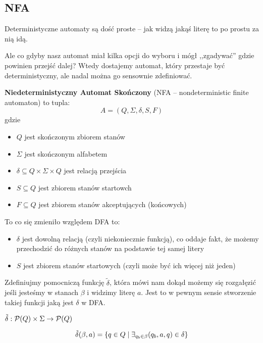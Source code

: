 \subsection{NFA}

Deterministyczne automaty są dość proste -- jak widzą jakąś literę to po prostu za nią idą.

Ale co gdyby nasz automat miał kilka opcji do wyboru i mógł ,,zgadywać'' gdzie powinien przejść dalej? Wtedy dostajemy automat, który przestaje być deterministyczny, ale nadal można go sensownie zdefiniować.

\begin{definition}
	\textbf{Niedeterministyczny Automat Skończony} (NFA -- nondeterministic finite automaton) to tupla:
	\[
		A = (Q, \Sigma, \delta, S, F)
	\]
	gdzie
	\begin{itemize}
		\item \( Q \) jest skończonym zbiorem stanów
		\item \( \Sigma \) jest skończonym alfabetem
		\item \( \delta \subseteq Q \times \Sigma \times Q \) jest relacją przejścia
		\item \( S \subseteq Q \) jest zbiorem stanów startowch
		\item \( F \subseteq Q \) jest zbiorem stanów akceptujących (końcowych)
	\end{itemize}
\end{definition}

To co się zmieniło względem DFA to:
\begin{itemize}
	\item \( \delta \) jest dowolną relacją (czyli niekoniecznie funkcją), co oddaje fakt, że możemy przechodzić do różnych stanów na podstawie tej samej litery
	\item \( S \) jest zbiorem stanów startowych (czyli może być ich więcej niż jeden)
\end{itemize}

Zdefiniujmy pomocniczą funkcję \( \tilde \delta \), która mówi nam dokąd możemy się rozgałęzić jeśli jesteśmy w stanach \( \beta \) i widzimy literę \( a \). Jest to w pewnym sensie stworzenie takiej funkcji jaką jest \( \delta \) w DFA.

\begin{definition}
	\( \tilde \delta : \powerset\pars{Q} \times \Sigma \rightarrow \powerset\pars{Q} \)

	\[
		\tilde \delta(\beta, a)
		= \set{q \in Q \mid \exists_{q_b \in \beta} (q_b, a, q) \in \delta}
	\]
\end{definition}


